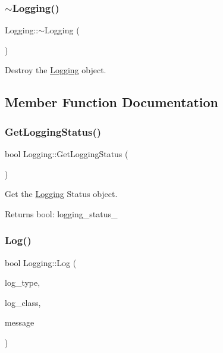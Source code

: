 \subsubsection{\texorpdfstring{$\sim$\+Logging()}{~Logging()}}
{\footnotesize\ttfamily Logging\+::$\sim$\+Logging (\begin{DoxyParamCaption}{ }\end{DoxyParamCaption})}



Destroy the \hyperlink{classLogging}{Logging} object. 



\subsection{Member Function Documentation}
\mbox{\label{classLogging_a739f193cbcadcec708a6af983039759f}} 
\subsubsection{\texorpdfstring{Get\+Logging\+Status()}{GetLoggingStatus()}}
{\footnotesize\ttfamily bool Logging\+::\+Get\+Logging\+Status (\begin{DoxyParamCaption}{ }\end{DoxyParamCaption})}



Get the \hyperlink{classLogging}{Logging} Status object. 

\begin{DoxyReturn}{Returns}
bool\+: logging\+\_\+status\+\_\+ 
\end{DoxyReturn}
\mbox{\label{classLogging_abefeba86ea7c9ec93b7de22fc03a558e}} 
\subsubsection{\texorpdfstring{Log()}{Log()}\hspace{0.1cm}{\footnotesize\ttfamily [1/2]}}
{\footnotesize\ttfamily bool Logging\+::\+Log (\begin{DoxyParamCaption}\item[{\hyperlink{namespaceCONFIG__SET_aaf9764960ee214f0eaabd2461e30e932}{C\+O\+N\+F\+I\+G\+\_\+\+S\+E\+T\+::\+L\+O\+G\+\_\+\+T\+Y\+PE}}]{log\+\_\+type,  }\item[{\hyperlink{namespaceCONFIG__SET_a3c4daebec2ea4e9f6affb5b3abbeb863}{C\+O\+N\+F\+I\+G\+\_\+\+S\+E\+T\+::\+L\+O\+G\+\_\+\+C\+L\+A\+SS}}]{log\+\_\+class,  }\item[{const char $\ast$}]{message }\end{DoxyParamCaption})}



